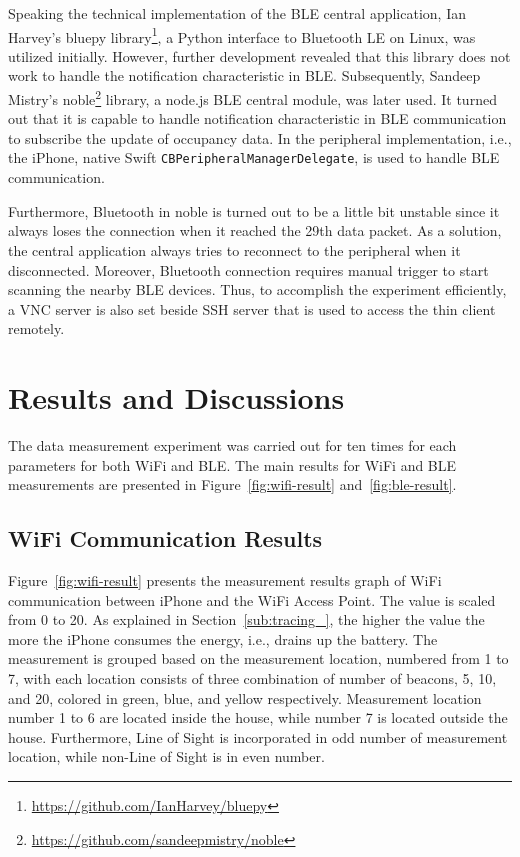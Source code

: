 \documentclass[journal]{vgtc}                %
\begin{document}

Speaking the technical implementation of the BLE central application, Ian Harvey's bluepy library\footnote{\url{https://github.com/IanHarvey/bluepy}}, a Python interface to Bluetooth LE on Linux, was utilized initially. However, further development revealed that this library does not work to handle the notification characteristic in BLE. Subsequently, Sandeep Mistry's noble\footnote{\url{https://github.com/sandeepmistry/noble}} library, a node.js BLE central module, was later used. It turned out that it is capable to handle notification characteristic in BLE communication to subscribe the update of occupancy data. In the peripheral implementation, i.e., the iPhone, native Swift \verb|CBPeripheralManagerDelegate|, is used to handle BLE communication.

Furthermore, Bluetooth in noble is turned out to be a little bit unstable since it always loses the connection when it reached the 29th data packet. As a solution, the central application always tries to reconnect to the peripheral when it disconnected. Moreover, Bluetooth connection requires manual trigger to start scanning the nearby BLE devices. Thus, to accomplish the experiment efficiently, a VNC server is also set beside SSH server that is used to access the thin client remotely.

\section{Results and Discussions} %
\label{sec:results_and_discussion}
The data measurement experiment was carried out for ten times for each parameters for both WiFi and BLE. The main results for WiFi and BLE measurements are presented in Figure~\ref{fig:wifi-result} and~\ref{fig:ble-result}.

\subsection{WiFi Communication Results} %
\label{sub:wifi_communication_results}
Figure~\ref{fig:wifi-result} presents the measurement results graph of WiFi communication between iPhone and the WiFi Access Point. The value is scaled from 0 to 20. As explained in Section~\ref{sub:tracing_}, the higher the value the more the iPhone consumes the energy, i.e., drains up the battery. The measurement is grouped based on the measurement location, numbered from 1 to 7, with each location consists of three combination of number of beacons, 5, 10, and 20, colored in green, blue, and yellow respectively. Measurement location number 1 to 6 are located inside the house, while number 7 is located outside the house. Furthermore, Line of Sight is incorporated in odd number of measurement location, while non-Line of Sight is in even number.
\end{document}
